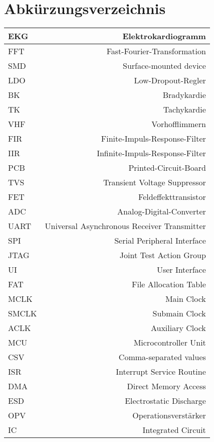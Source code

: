 
\section{Abkürzungsverzeichnis} 

\begin{tabular}[]{l|r}
EKG & Elektrokardiogramm 
\\
\hline
FFT & Fast-Fourier-Transformation 
\\
\hline
SMD & Surface-mounted device 
\\
\hline
LDO & Low-Dropout-Regler 
\\
\hline
BK & Bradykardie 
\\
\hline
TK & Tachykardie
\\
\hline
VHF & Vorhofflimmern
\\
\hline
FIR & Finite-Impuls-Response-Filter
\\
\hline
IIR & Infinite-Impuls-Response-Filter
\\
\hline
PCB & Printed-Circuit-Board
\\
\hline
TVS & Transient Voltage Suppressor
\\
\hline
FET & Feldeffekttransistor
\\
\hline
ADC & Analog-Digital-Converter
\\
\hline
UART & Universal Asynchronous Receiver Transmitter
\\
\hline
SPI & Serial Peripheral Interface
\\
\hline
JTAG & Joint Test Action Group
\\
\hline
UI & User Interface
\\
\hline
FAT & File Allocation Table
\\
\hline
MCLK & Main Clock
\\
\hline
SMCLK & Submain Clock
\\
\hline
ACLK & Auxiliary Clock
\\
\hline
MCU & Microcontroller Unit
\\
\hline
CSV & Comma-separated values
\\
\hline
ISR & Interrupt Service Routine
\\
\hline
DMA & Direct Memory Access
\\
\hline
ESD & Electrostatic Discharge
\\
\hline
OPV & Operationsverstärker
\\
\hline
IC & Integrated Circuit

\end{tabular}
